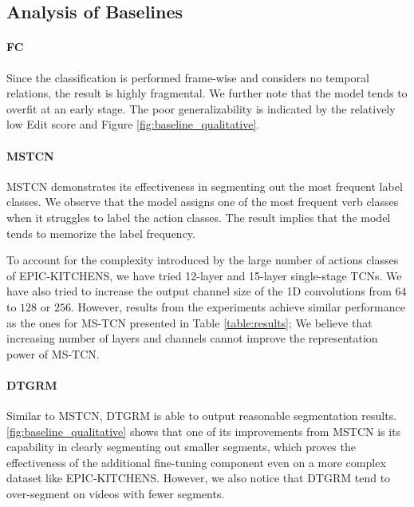 \subsection{Analysis of Baselines}

\paragraph{FC}
Since the classification is performed frame-wise and considers no temporal relations, the result is highly fragmental. We further note that the model tends to overfit at an early stage. The poor generalizability is indicated by the relatively low Edit score and Figure \ref{fig:baseline_qualitative}. %


\paragraph{MSTCN} 
MSTCN demonstrates its effectiveness in segmenting out the most frequent label classes. 
We observe that the model assigns one of the most frequent verb classes when it struggles to label the action classes. The result implies that the model tends to memorize the label frequency.

To account for the complexity introduced by the large number of actions classes of EPIC-KITCHENS, we have tried 12-layer and 15-layer single-stage TCNs. We have also tried to increase the output channel size of the 1D convolutions from $64$ to $128$ or $256$. However, results from the experiments achieve similar performance as the ones for MS-TCN presented in Table \ref{table:results}; We believe that increasing number of layers and channels cannot improve the representation power of MS-TCN. 
\paragraph{DTGRM} 
Similar to MSTCN, DTGRM is able to output reasonable segmentation results. \ref{fig:baseline_qualitative} shows that one of its improvements from MSTCN is its capability in clearly segmenting out smaller segments, which proves the effectiveness of the additional fine-tuning component even on a more complex dataset like EPIC-KITCHENS. However, we also notice that DTGRM tend to over-segment on videos with fewer segments.

